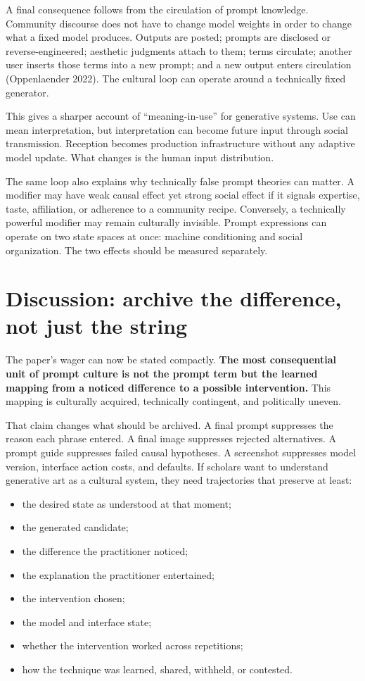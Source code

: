 \documentclass[
  11pt,
  letterpaper,
]{article}
\providecommand{\tightlist}{%
  \setlength{\itemsep}{0pt}\setlength{\parskip}{0pt}}
\begin{document}
A final consequence follows from the circulation of prompt knowledge.
Community discourse does not have to change model weights in order to
change what a fixed model produces. Outputs are posted; prompts are
disclosed or reverse-engineered; aesthetic judgments attach to them;
terms circulate; another user inserts those terms into a new prompt; and
a new output enters circulation (Oppenlaender 2022). The cultural loop
can operate around a technically fixed generator.

This gives a sharper account of ``meaning-in-use'' for generative
systems. Use can mean interpretation, but interpretation can become
future input through social transmission. Reception becomes production
infrastructure without any adaptive model update. What changes is the
human input distribution.

The same loop also explains why technically false prompt theories can
matter. A modifier may have weak causal effect yet strong social effect
if it signals expertise, taste, affiliation, or adherence to a community
recipe. Conversely, a technically powerful modifier may remain
culturally invisible. Prompt expressions can operate on two state spaces
at once: machine conditioning and social organization. The two effects
should be measured separately.

\section{Discussion: archive the difference, not just the
string}\label{discussion-archive-the-difference-not-just-the-string}

The paper's wager can now be stated compactly. \textbf{The most
consequential unit of prompt culture is not the prompt term but the
learned mapping from a noticed difference to a possible intervention.}
This mapping is culturally acquired, technically contingent, and
politically uneven.

That claim changes what should be archived. A final prompt suppresses
the reason each phrase entered. A final image suppresses rejected
alternatives. A prompt guide suppresses failed causal hypotheses. A
screenshot suppresses model version, interface action costs, and
defaults. If scholars want to understand generative art as a cultural
system, they need trajectories that preserve at least:

\begin{itemize}
\tightlist
\item
  the desired state as understood at that moment;
\item
  the generated candidate;
\item
  the difference the practitioner noticed;
\item
  the explanation the practitioner entertained;
\item
  the intervention chosen;
\item
  the model and interface state;
\item
  whether the intervention worked across repetitions;
\item
  how the technique was learned, shared, withheld, or contested.
\end{itemize}
\end{document}
